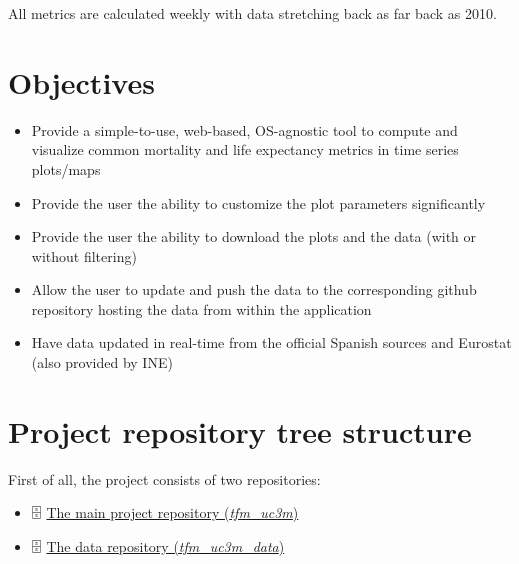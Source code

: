 \documentclass[]{article}
\begin{document}
All metrics are calculated weekly with data stretching back as far back
as 2010.

\hypertarget{objectives}{%
\section{Objectives}\label{objectives}}

\begin{itemize}
\item
  Provide a simple-to-use, web-based, OS-agnostic tool to compute and
  visualize common mortality and life expectancy metrics in time series
  plots/maps
\item
  Provide the user the ability to customize the plot parameters
  significantly
\item
  Provide the user the ability to download the plots and the data (with
  or without filtering)
\item
  Allow the user to update and push the data to the corresponding github
  repository hosting the data from within the application
\item
  Have data updated in real-time from the official Spanish sources and
  Eurostat (also provided by INE)
\end{itemize}

\hypertarget{project-repository-tree-structure}{%
\section{Project repository tree
structure}\label{project-repository-tree-structure}}

First of all, the project consists of two repositories:

\begin{itemize}
\item
  🗄️ \href{https://github.com/dreth/tfm_uc3m}{The main project
  repository (\emph{tfm\_uc3m})}
\item
  🗄️ \href{https://github.com/dreth/tfm_c3m_data}{The data repository
  (\emph{tfm\_uc3m\_data})}
\end{itemize}
\end{document}
